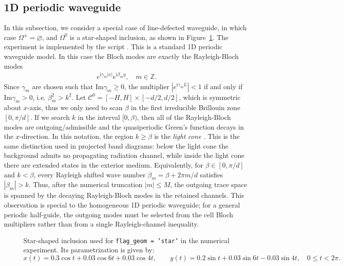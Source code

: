 \documentclass[11pt,fleqn]{article}
\renewcommand{\Im}{\mathrm{Im}}
\newcommand{\ii}{\mathrm{i}}
\theoremstyle{definition}
\theoremstyle{remark}
\begin{document}
\subsection{1D periodic waveguide}
In this subsection, we consider a special case of line-defected waveguide, in which case
\(\Omega^\pm = \varnothing\), and \(\Omega^0\) is a star-shaped inclusion, as
shown in Figure~\ref{fig:1d-waveguide-inclusion}. The experiment is
implemented by the script . This is
a standard 1D periodic waveguide model. In this case the Bloch modes are exactly the Rayleigh-Bloch modes\begin{align*}
  e^{\ii \gamma_m |x|}e^{\ii \beta_m y},\quad m\in\mathbb{Z}.
\end{align*}
Since $\gamma_m$ are chosen such that $\Im \gamma_m \geq 0$, the multiplier $|e^{\ii \gamma_m L}| < 1$ if and only if $\Im \gamma_m > 0$, i.e. $\beta_m^2 > k^2$. Let 
$\mathcal{C}^0 = [-H, H] \times [-d/2, d/2]$, which is symmetric about $x$-axis, thus
we only need to scan $\beta$ in the first irreducible Brillouin zone \([0,\pi/d]\). 
If we search $k$ in the interval $[0, \beta)$, then all of the Rayleigh-Bloch modes are
outgoing/admissible and the quasiperiodic Green's function decays in the $x$-direction.
In this notation, the region \(k\geq \beta\) is the \emph{light cone}
\cite[Chapter~7]{Joannopoulos2011}. This is the
same distinction used in projected band diagrams: below the light cone the
background admits no propagating radiation channel, while inside the light cone
there are extended states in the exterior medium. Equivalently, for
\(\beta\in[0,\pi/d]\) and \(k<\beta\), every Rayleigh shifted wave number
\(\beta_m=\beta+2\pi m/d\) satisfies \(|\beta_m|>k\). Thus, after the numerical
truncation \(|m|\leq M\), the outgoing trace space is spanned by the decaying
Rayleigh-Bloch modes in the retained channels. This observation is special to
the homogeneous 1D periodic waveguide; for a general periodic half-guide, the
outgoing modes must be selected from the cell Bloch multipliers rather than
from a single Rayleigh-channel inequality.

\begin{figure}[htbp]
\centering
{}
\caption{Star-shaped inclusion used for \texttt{flag\_geom = 'star'} in the
numerical experiment. Its parametrization is given by:
\[
  x(t)=0.3\cos t+0.03\cos 6t+0.03\cos 4t,\qquad
  y(t)=0.2\sin t+0.03\sin 6t-0.03\sin 4t,
  \quad 0\leq t<2\pi .
\]}
\label{fig:1d-waveguide-inclusion}
\end{figure}
\end{document}
